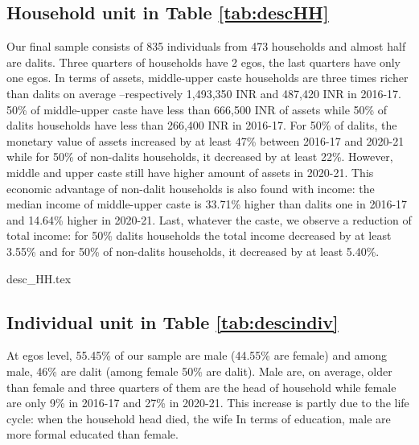 \documentclass[a4paper, 11pt, onecolumn]{article}
\begin{document}
\subsection{Household unit in Table \ref{tab:descHH}}
Our final sample consists of 835 individuals from 473 households and almost half are dalits.
Three quarters of households have 2 egos, the last quarters have only one egos.
In terms of assets, middle-upper caste households are three times richer than dalits on average --respectively 1,493,350 INR and 487,420 INR in 2016-17.
50\% of middle-upper caste have less than 666,500 INR of assets while 50\% of dalits households have less than 266,400 INR in 2016-17.
For 50\% of dalits, the monetary value of assets increased by at least 47\% between 2016-17 and 2020-21 while for 50\% of non-dalits households, it decreased by at least 22\%.
However, middle and upper caste still have higher amount of assets in 2020-21.
This economic advantage of non-dalit households is also found with income: the median income of middle-upper caste is 33.71\% higher than dalits one in 2016-17 and 14.64\% higher in 2020-21.
Last, whatever the caste, we observe a reduction of total income: for 50\% dalits households the total income decreased by at least 3.55\% and for 50\% of non-dalits households, it decreased by at least 5.40\%.
		
{desc_HH.tex}

\subsection{Individual unit in Table \ref{tab:descindiv}}
At egos level, 55.45\% of our sample are male (44.55\% are female) and among male, 46\% are dalit (among female 50\% are dalit).
Male are, on average, older than female and three quarters of them are the head of household while female are only 9\% in 2016-17 and 27\% in 2020-21.
This increase is partly due to the life cycle: when the household head died, the wife 
In terms of education, male are more formal educated than female.
\end{document}
